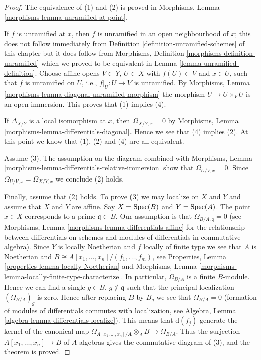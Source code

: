 \begin{proof}
The equivalence of (1) and (2) is proved in
Morphisms, Lemma \ref{morphisms-lemma-unramified-at-point}.

\medskip\noindent
If $f$ is unramified at $x$, then $f$ is unramified in an open
neighbourhood of $x$; this does not follow immediately
from Definition \ref{definition-unramified-schemes} of this chapter
but it does follow from
Morphisms, Definition \ref{morphisms-definition-unramified} which we
proved to be equivalent in
Lemma \ref{lemma-unramified-definition}.
Choose affine opens $V \subset Y$, $U \subset X$
with $f(U) \subset V$ and $x \in U$, such that $f$ is
unramified on $U$, i.e., $f|_U : U \to V$ is unramified.
By Morphisms, Lemma \ref{morphisms-lemma-diagonal-unramified-morphism}
the morphism $U \to U \times_V U$
is an open immersion. This proves that (1) implies (4).

\medskip\noindent
If $\Delta_{X/Y}$ is a local isomorphism at $x$, then
$\Omega_{X/Y, x} = 0$ by
Morphisms, Lemma \ref{morphisms-lemma-differentials-diagonal}.
Hence we see that (4) implies (2).
At this point we know that (1), (2) and (4) are all equivalent.

\medskip\noindent
Assume (3). The assumption on the diagram combined with
Morphisms, Lemma \ref{morphisms-lemma-differentials-relative-immersion}
show that $\Omega_{U/V, x} = 0$. Since $\Omega_{U/V, x} = \Omega_{X/Y, x}$
we conclude (2) holds.

\medskip\noindent
Finally, assume that (2) holds. To prove (3) we may localize on
$X$ and $Y$ and assume that $X$ and $Y$ are affine.
Say $X = \mathop{\mathrm{Spec}}(B)$ and $Y = \mathop{\mathrm{Spec}}(A)$.
The point $x \in X$ corresponds to a prime $\mathfrak q \subset B$.
Our assumption is that $\Omega_{B/A, \mathfrak q} = 0$
(see Morphisms, Lemma \ref{morphisms-lemma-differentials-affine} for the
relationship between differentials on schemes and modules
of differentials in commutative algebra).
Since $Y$ is locally Noetherian and $f$ locally of finite type
we see that $A$ is Noetherian and
$B \cong A[x_1, \ldots, x_n]/(f_1, \ldots, f_m)$, see
Properties, Lemma \ref{properties-lemma-locally-Noetherian} and
Morphisms, Lemma \ref{morphisms-lemma-locally-finite-type-characterize}.
In particular, $\Omega_{B/A}$ is a finite $B$-module. Hence we
can find a single $g \in B$, $g \not \in \mathfrak q$ such that
the principal localization $(\Omega_{B/A})_g$ is zero. Hence after
replacing $B$ by $B_g$ we see that $\Omega_{B/A} = 0$ (formation
of modules of differentials commutes with localization, see
Algebra, Lemma \ref{algebra-lemma-differentials-localize}). This means that
$\text{d}(f_j)$ generate the kernel of the canonical map
$\Omega_{A[x_1, \ldots, x_n]/A} \otimes_A B \to \Omega_{B/A}$.
Thus the surjection $A[x_1, \ldots, x_n] \to B$ of $A$-algebras gives the
commutative diagram of (3), and the theorem is proved.
\end{proof}

